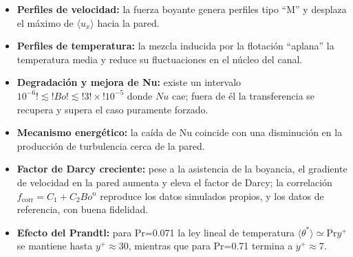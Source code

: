 \begin{itemize}

\item \textbf{Perfiles de velocidad:} la fuerza boyante genera perfiles tipo ``M'' y desplaza el máximo de $\langle u_x\rangle$ hacia la pared.

\item \textbf{Perfiles de temperatura:} la mezcla inducida por la flotación ``aplana'' la temperatura media y reduce su fluctuaciones en el núcleo del canal.

\item \textbf{Degradación y mejora de Nu:} existe un intervalo $10^{-6}!\lesssim!Bo!\lesssim!3!\times!10^{-5}$ donde $Nu$ cae; fuera de él la transferencia se recupera y supera el caso puramente forzado.

\item \textbf{Mecanismo energético:} la caída de Nu coincide con una disminución en la producción de turbulencia cerca de la pared.

\item \textbf{Factor de Darcy creciente:} pese a la asistencia de la boyancia, el gradiente de velocidad en la pared aumenta y eleva el factor de Darcy; la correlación $f_{\text{corr}}=C_1+C_2 Bo^n$ reproduce los datos simulados propios, y los datos de referencia, con buena fidelidad.

\item \textbf{Efecto del Prandtl:} para Pr=0.071 la ley lineal de temperatura $\langle\theta^*\rangle \simeq \text{Pr} y^+$ se mantiene hasta $y^+ \approx 30$, mientras que para Pr=0.71 termina a $y^+ \approx 7$.
\end{itemize}